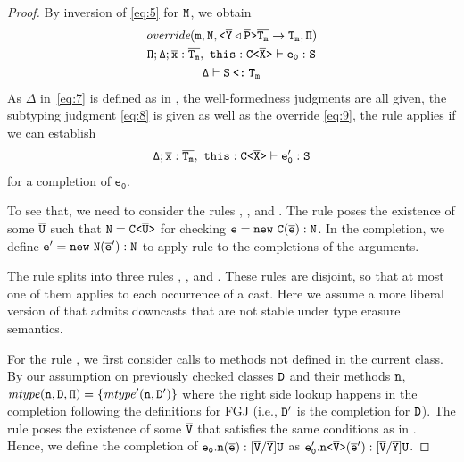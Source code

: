 \begin{proof}
    By inversion of \eqref{eq:5} for ${\tt M}$, we obtain
    \begin{gather}
      \label{eq:6}
      \mathtt{\textit{override}(m, N, \mathtt{ \texttt{<} \overline{\tt Y} \triangleleft \overline{\tt P} \texttt{>} }\overline{\tt T_m} \to T_m,
        \Pi) } \\
      \label{eq:9}
      \mathtt{\Pi; \Delta ; \overline{\tt x}:\overline{\tt T_m},\ this : \mathtt{C \texttt{<} \overline{\tt X} \texttt{>} } \vdash e_0 : S} \\
      \label{eq:8}
      \mathtt{\Delta \vdash S \mathbin{\texttt{<:}}  T_m }
    \end{gather}
    As $\mathtt{\Delta}$ in~\eqref{eq:7} is defined as in , the well-formedness
    judgments are all given, the subtyping judgment \eqref{eq:8} is given as well as the override
    \eqref{eq:9}, the rule  applies if we can establish
    \begin{gather}
      \label{eq:10}
      \mathtt{\Delta ; \overline{\tt x}:\overline{\tt T_m},\ this : \mathtt{C \texttt{<} \overline{\tt X} \texttt{>} } \vdash e_0' : S}
    \end{gather}
    for a completion of $\mathtt{e_0}$.

    To see that, we need to consider the rules ,
    , and . The 
     rule poses the existence of some $\overline{\tt U}$ such that ${\tt N} =
    \mathtt{C \texttt{<} \overline{\tt U} \texttt{>} }$ for checking ${\tt e} = {\tt new}\ {\tt C} (\overline{\tt e}) : {\tt N}$. In the completion, we
    define ${\tt e'} = {\tt new}\ {\tt N} (\overline{\tt e}') : {\tt N}$ to apply rule  to the completions
    of the arguments.

    The rule  splits into three rules
    , , and
    . These rules are disjoint, so that at most one of
    them applies to each occurrence of a cast. Here we assume a more
    liberal version of  that admits downcasts that
    are not stable under type erasure semantics.

    For the rule , we first consider calls to methods not defined in the current
    class. By our assumption on previously checked classes ${\tt D}$ and their methods ${\tt n}$,
    $\mathit{mtype} ({\tt n}, {\tt D}, {\tt \Pi}) = \{\mathit{mtype}' ({\tt n}, {\tt D}')\}$ where the right
    side lookup happens in the completion following the definitions for FGJ (i.e., ${\tt D'}$ is the
    completion for ${\tt D}$). The  rule poses the existence of some $\overline{\tt V}$ that
    satisfies the same conditions as in . Hence, we define the completion of
    $\mathtt{e_0.{\tt n}(\overline{\tt e}) : [\overline{\tt V}/\overline{\tt Y}]U }$ as
    $\mathtt{e_0'.\mathtt{n \texttt{<} \overline{\tt V} \texttt{>} }(\overline{\tt e}') : [\overline{\tt V}/\overline{\tt Y}]U }$.


\end{proof}
